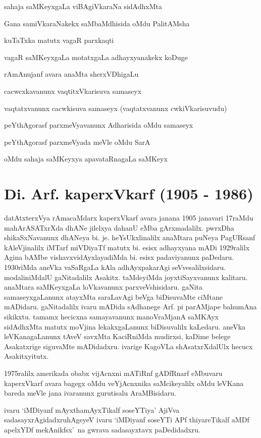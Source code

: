 sahaja saMKeyxgaLa viBAgiVkaraNa sidAdhxMta

Gana samiVkaraNakekx saMbaMdhisida oMdu PalitAMsha

kuTaTxka matutx vagaR parxkaqti

vagaR saMKeyxgaLa motatxgaLa adhayxyanakekx koDuge

rAmAnujanf avara anaMta sherxVDhigaLu

cacwcxkavanunx vaqtitxVkarisuva samaseyx

vaqtatxvanunx cacwkisuva samaseyx (vaqtatxvanunx cwkiVkarisuvudu)

peYthAgorasf parxmeVyavanunx Adharisida oMdu samaseyx

peYthAgorasf parxmeVyada meVle oMdu SarA

oMdu sahaja saMKeyxya apavataRnagaLa saMKeyx

\section{{\protect\bf Di. Arf. kaperxVkarf  {\rm (1905 - 1986)}}}

\vskip -0.2cm

datAtxterxVya rAmacaMdarx kaperxVkarf avara janana {\rm 1905} janavari {\rm 17}raMdu mahArASATxrXda dhANe jilelxya dahanU eMba gArxmadalilx. pwrxDha shikaSxNavanunx dhANeya bi. je. heYsUkxli\-nalilx anaMtara puNeya PagURsanf kAleVjinalilx iMTarf miVDiyaTf matutx bi. esisx adhayxyana mADi {\rm 1929}ralilx Agina bAMbe vishavxvidAyxlayadiMda bi. esisx padaviyanunx paDedaru. {\rm 1930}riMda aneVka vaSaRgaLa kAla adhAyxpakarAgi seVvesalilxsidaru. modali\-niMdalU gaNitadalilx Asakitx. taMdeyiMda joyxtiSayxvanunx kalitaru. anaMtara saMKeyxgaLa loVkavanunx parxveVshisidaru. gaNita samaseyxgaLanunx atayxMta saraLavAgi beVga biDisuvaMte ciMtane mADidaru. gaNitadalilx ivaru mADida sAdhanege Arf. pi parAMjape bahumAna sikikxtu. tamamx hecicxna samayavanunx manoVraMjanA saMKAyx sidAdhxMta matutx moVjina lekakxgaLanunx biDisuvalilx kaLedaru. aneVka leVKanagaLanunx tAveV savxMta KaciRniMda mudirxsi, kaDime belege Asakatxrige siguvaMte mADidadxru. ivarige KagoVLa shAsatxrXdalUlx hecucx Asakitxyitutx. 

{\rm 1975}ralilx amerikada obabx vijAcnxni mATiRnf gADfRnarf eMbuvaru kaperxVkarf avara bagegx oMdu veYjAcnxnika saMcikeyalilx oMdu leVKana bareda meVle jana ivaranunx gurutisalu AraMBisidaru.

ivaru `iMDiyanf mAyxthamAyxTikalf soseYTiya' AjiVva sadasayxrAgidadxru\break hAgeyeV ivaru `iMDiyanf soseYTi APf thiyareTikalf aMDf apelxYDf mekAnikfsx'~na gwrava sadasayxtavx paDedidadxru.


